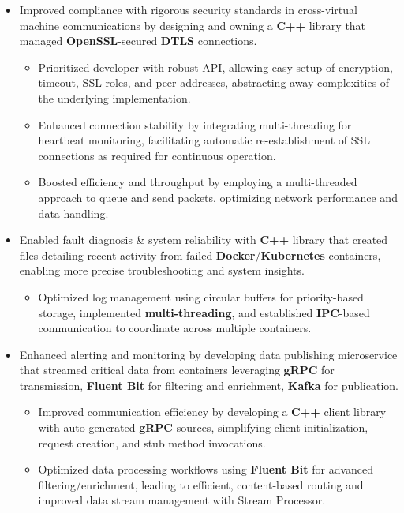 \documentclass[a4paper]{article}
\begin{document}
\begin{itemize}
	\item Improved compliance with rigorous security standards in cross-virtual machine communications by designing and owning a \textbf{C++} library that managed \textbf{OpenSSL}-secured \textbf{DTLS} connections.
        \begin{itemize}
	        \item Prioritized developer with robust API, allowing easy setup of encryption, timeout, SSL roles, and peer addresses, abstracting away complexities of the underlying implementation.
	        \item Enhanced connection stability by integrating multi-threading for heartbeat monitoring, facilitating automatic re-establishment of SSL connections as required for continuous operation.
	        \item Boosted efficiency and throughput by employing a multi-threaded approach to queue and send packets, optimizing network performance and data handling.
        \end{itemize}
	\item Enabled fault diagnosis \& system reliability with \textbf{C++} library that created files detailing recent activity from failed \textbf{Docker}/\textbf{Kubernetes} containers, enabling more precise troubleshooting and system insights.
        \begin{itemize}
	        \item Optimized log management using circular buffers for priority-based storage, implemented \textbf{multi-threading}, and established \textbf{IPC}-based communication to coordinate across multiple containers.
        \end{itemize}
	\item Enhanced alerting and monitoring by developing data publishing microservice that streamed critical data from containers leveraging \textbf{gRPC} for transmission, \textbf{Fluent Bit} for filtering and enrichment, \textbf{Kafka} for publication.
        \begin{itemize}
	        \item Improved communication efficiency by developing a \textbf{C++} client library with auto-generated \textbf{gRPC} sources, simplifying client initialization, request creation, and stub method invocations.
	        \item Optimized data processing workflows using \textbf{Fluent Bit} for advanced filtering/enrichment, leading to efficient, content-based routing and improved data stream management with Stream Processor.

\end{itemize}
\end{itemize}
\end{document}
